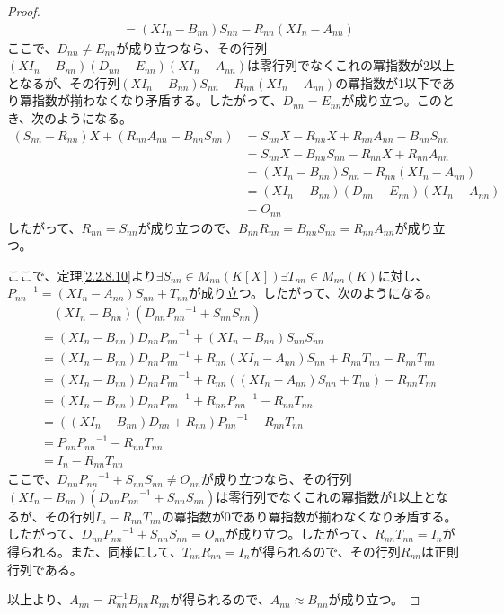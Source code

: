 \documentclass[dvipdfmx]{jsarticle}
\begin{document}
\begin{proof}
\begin{align*}
&= \left( XI_{n} - B_{nn} \right)S_{nn} - R_{nn}\left( XI_{n} - A_{nn} \right)
\end{align*}
ここで、$D_{nn} \neq E_{nn}$が成り立つなら、その行列$\left( XI_{n} - B_{nn} \right)\left( D_{nn} - E_{nn} \right)\left( XI_{n} - A_{nn} \right)$は零行列でなくこれの冪指数が2以上となるが、その行列$\left( XI_{n} - B_{nn} \right)S_{nn} - R_{nn}\left( XI_{n} - A_{nn} \right)$の冪指数が1以下であり冪指数が揃わなくなり矛盾する。したがって、$D_{nn} = E_{nn}$が成り立つ。このとき、次のようになる。
\begin{align*}
\left( S_{nn} - R_{nn} \right)X + \left( R_{nn}A_{nn} - B_{nn}S_{nn} \right) &= S_{nn}X - R_{nn}X + R_{nn}A_{nn} - B_{nn}S_{nn}\\
&= S_{nn}X - B_{nn}S_{nn} - R_{nn}X + R_{nn}A_{nn}\\
&= \left( XI_{n} - B_{nn} \right)S_{nn} - R_{nn}\left( XI_{n} - A_{nn} \right)\\
&= \left( XI_{n} - B_{nn} \right)\left( D_{nn} - E_{nn} \right)\left( XI_{n} - A_{nn} \right)\\
&= O_{nn}
\end{align*}
したがって、$R_{nn} = S_{nn}$が成り立つので、$B_{nn}R_{nn} = B_{nn}S_{nn} = R_{nn}A_{nn}$が成り立つ。\par
ここで、定理\ref{2.2.8.10}より$\exists S_{nn} \in M_{nn}\left( K[ X] \right)\exists T_{nn} \in M_{nn}(K)$に対し、${P_{nn}}^{- 1} = \left( XI_{n} - A_{nn} \right)S_{nn} + T_{nn}$が成り立つ。したがって、次のようになる。
\begin{align*}
&\quad \left( XI_{n} - B_{nn} \right)\left( D_{nn}{P_{nn}}^{- 1} + S_{nn}S_{nn} \right)\\
&= \left( XI_{n} - B_{nn} \right)D_{nn}{P_{nn}}^{- 1} + \left( XI_{n} - B_{nn} \right)S_{nn}S_{nn}\\
&= \left( XI_{n} - B_{nn} \right)D_{nn}{P_{nn}}^{- 1} + R_{nn}\left( XI_{n} - A_{nn} \right)S_{nn} + R_{nn}T_{nn} - R_{nn}T_{nn}\\
&= \left( XI_{n} - B_{nn} \right)D_{nn}{P_{nn}}^{- 1} + R_{nn}\left( \left( XI_{n} - A_{nn} \right)S_{nn} + T_{nn} \right) - R_{nn}T_{nn}\\
&= \left( XI_{n} - B_{nn} \right)D_{nn}{P_{nn}}^{- 1} + R_{nn}{P_{nn}}^{- 1} - R_{nn}T_{nn}\\
&= \left( \left( XI_{n} - B_{nn} \right)D_{nn} + R_{nn} \right){P_{nn}}^{- 1} - R_{nn}T_{nn}\\
&= P_{nn}{P_{nn}}^{- 1} - R_{nn}T_{nn}\\
&= I_{n} - R_{nn}T_{nn}
\end{align*}
ここで、$D_{nn}{P_{nn}}^{- 1} + S_{nn}S_{nn} \neq O_{nn}$が成り立つなら、その行列$\left( XI_{n} - B_{nn} \right)\left( D_{nn}{P_{nn}}^{- 1} + S_{nn}S_{nn} \right)$は零行列でなくこれの冪指数が1以上となるが、その行列$I_{n} - R_{nn}T_{nn}$の冪指数が0であり冪指数が揃わなくなり矛盾する。したがって、$D_{nn}{P_{nn}}^{- 1} + S_{nn}S_{nn} = O_{nn}$が成り立つ。したがって、$R_{nn}T_{nn} = I_{n}$が得られる。また、同様にして、$T_{nn}R_{nn} = I_{n}$が得られるので、その行列$R_{nn}$は正則行列である。\par
以上より、$A_{nn} = R_{nn}^{- 1}B_{nn}R_{nn}$が得られるので、$A_{nn} \approx B_{nn}$が成り立つ。
\end{proof}
\end{document}

